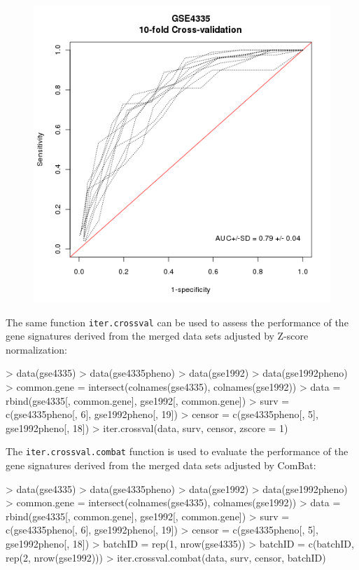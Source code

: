 \documentclass[a4paper]{article}
\begin{document}
\begin{figure}[h]
\begin{center}
\includegraphics[scale = 0.5]{AUC10fCVgse43351gn.png}
\end{center}
\end{figure}

The same function \verb+iter.crossval+ can be used to assess the performance of the gene signatures derived from the merged data sets adjusted by Z-score normalization:

\begin{Schunk}
\begin{Sinput}
> data(gse4335)
> data(gse4335pheno)
> data(gse1992)
> data(gse1992pheno)
> common.gene = intersect(colnames(gse4335), colnames(gse1992))
> data = rbind(gse4335[, common.gene], gse1992[, common.gene])
> surv = c(gse4335pheno[, 6], gse1992pheno[, 19])
> censor = c(gse4335pheno[, 5], gse1992pheno[, 18])
> iter.crossval(data, surv, censor, zscore = 1)
\end{Sinput}
\end{Schunk}

The \verb+iter.crossval.combat+ function is used to evaluate the performance of the gene signatures derived from the merged data sets adjusted by ComBat:

\begin{Schunk}
\begin{Sinput}
> data(gse4335)
> data(gse4335pheno)
> data(gse1992)
> data(gse1992pheno)
> common.gene = intersect(colnames(gse4335), colnames(gse1992))
> data = rbind(gse4335[, common.gene], gse1992[, common.gene])
> surv = c(gse4335pheno[, 6], gse1992pheno[, 19])
> censor = c(gse4335pheno[, 5], gse1992pheno[, 18])
> batchID = rep(1, nrow(gse4335))
> batchID = c(batchID, rep(2, nrow(gse1992)))
> iter.crossval.combat(data, surv, censor, batchID)
\end{Sinput}
\end{Schunk}
\end{document}
